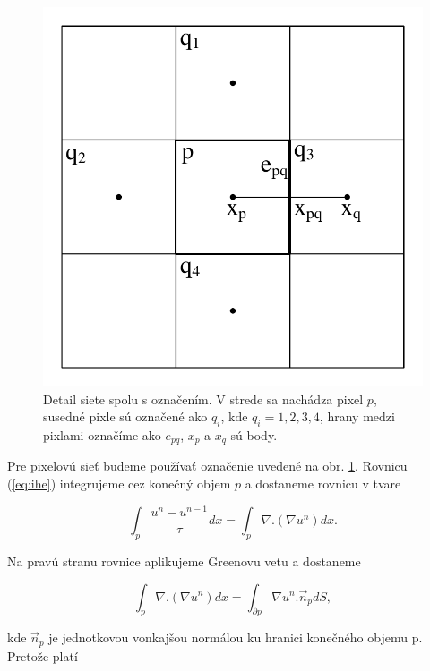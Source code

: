 \documentclass[a4paper,11pt,twoside]{article}%
\begin{document}
\begin{figure}[h!]
 \begin{center} 
 \includegraphics[scale=0.40]{pics/hrany1.pdf}
\caption{Detail siete spolu s označením. V strede sa nachádza pixel $p$, susedné pixle sú označené ako $q_i$, kde $q_i = 1, 2, 3, 4$, hrany medzi pixlami označíme ako $e_{pq}$, $x_p$ a $x_q$ sú body. }
\end{center} 
\label{fig:hrany}
\end{figure}

Pre pixelovú sieť budeme používať označenie uvedené na obr. \ref{fig:hrany}.
Rovnicu (\ref{eq:ihe}) integrujeme cez konečný objem $p$ a dostaneme rovnicu v tvare

\begin{equation} 
\int_p\frac{u^n - u^{n-1}}{\tau} dx = \int_p\nabla . (\nabla u^n)dx.
\end{equation}

Na pravú stranu rovnice aplikujeme Greenovu vetu a dostaneme

\begin{equation} 
\int_p\nabla . (\nabla u^n)dx = \int_{\partial p} \nabla u^n . \vec{n}_pdS,
\end{equation}

kde $\vec{n}_p$ je jednotkovou vonkajšou normálou ku hranici konečného objemu p.
Pretože platí
\end{document}
